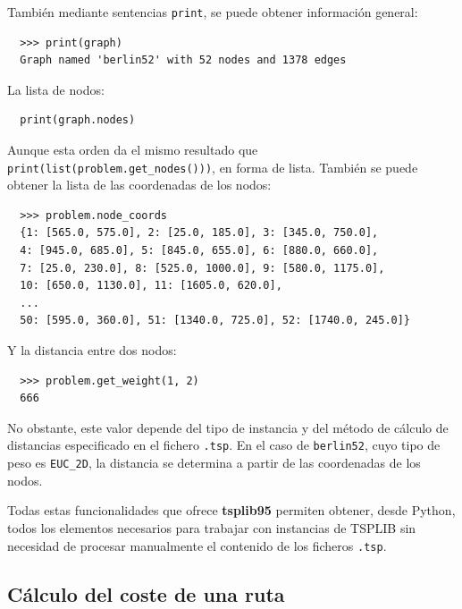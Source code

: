 También mediante sentencias \texttt{print}, se puede obtener información general:

\begin{verbatim}
  >>> print(graph)
  Graph named 'berlin52' with 52 nodes and 1378 edges
\end{verbatim}

La lista de nodos:

\begin{verbatim}
  print(graph.nodes)
\end{verbatim}

Aunque esta orden da el mismo resultado que \texttt{print(list(problem.get\_nodes()))}, en forma de lista. También se puede
obtener la lista de las coordenadas de los nodos:

\begin{verbatim}
  >>> problem.node_coords
  {1: [565.0, 575.0], 2: [25.0, 185.0], 3: [345.0, 750.0], 
  4: [945.0, 685.0], 5: [845.0, 655.0], 6: [880.0, 660.0], 
  7: [25.0, 230.0], 8: [525.0, 1000.0], 9: [580.0, 1175.0], 
  10: [650.0, 1130.0], 11: [1605.0, 620.0], 
  ...
  50: [595.0, 360.0], 51: [1340.0, 725.0], 52: [1740.0, 245.0]}
\end{verbatim}

Y la distancia entre dos nodos:

\begin{verbatim}
  >>> problem.get_weight(1, 2)
  666
\end{verbatim}

No obstante, este valor depende del tipo de instancia y del método de cálculo de distancias especificado en el fichero
\texttt{.tsp}. En el caso de \texttt{berlin52}, cuyo tipo de peso es \texttt{EUC\_2D}, la distancia se determina a partir
de las coordenadas de los nodos.

Todas estas funcionalidades que ofrece \textbf{tsplib95} permiten obtener, desde Python, todos los elementos necesarios
para trabajar con instancias de TSPLIB sin necesidad de procesar manualmente el contenido de los ficheros \texttt{.tsp}.

\subsection{Cálculo del coste de una ruta}
\label{subsec:route_cost_calc}

